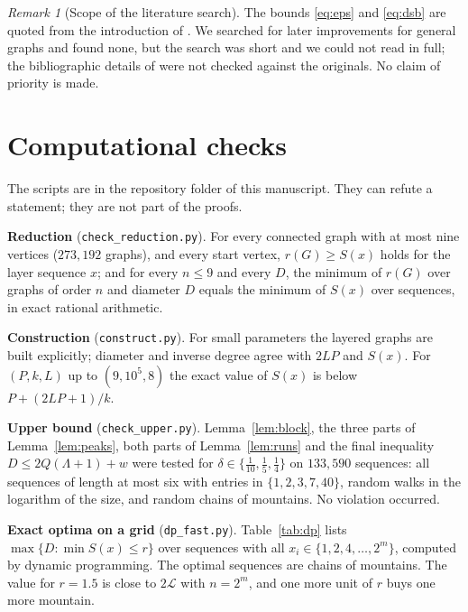 \documentclass[11pt]{amsart}
\theoremstyle{definition}
\theoremstyle{remark}
\newtheorem{remark}[theorem]{Remark}
\newcommand{\Lz}{\mathcal{L}}
\begin{document}
\begin{remark}[Scope of the literature search]
The bounds \eqref{eq:eps} and \eqref{eq:dsb} are quoted from the introduction of \cite{LS}.
We searched for later improvements for general graphs and found none, but the search was short and we could not read \cite{EPS,DSB,M10} in full; the bibliographic details of \cite{DSB,EPS,FMP,LS} were not checked against the originals.
No claim of priority is made.
\end{remark}

\appendix
\section{Computational checks}

The scripts are in the repository folder of this manuscript. They can refute a statement; they are not part of the proofs.

\smallskip\noindent\textbf{Reduction} (\texttt{check\_reduction.py}).
For every connected graph with at most nine vertices ($273{,}192$ graphs), and every start vertex, $r(G)\ge S(x)$ holds for the layer sequence $x$; and for every $n\le9$ and every $D$, the minimum of $r(G)$ over graphs of order $n$ and diameter $D$ equals the minimum of $S(x)$ over sequences, in exact rational arithmetic.

\smallskip\noindent\textbf{Construction} (\texttt{construct.py}).
For small parameters the layered graphs are built explicitly; diameter and inverse degree agree with $2LP$ and $S(x)$. For $(P,k,L)$ up to $(9,10^5,8)$ the exact value of $S(x)$ is below $P+(2LP+1)/k$.

\smallskip\noindent\textbf{Upper bound} (\texttt{check\_upper.py}).
Lemma~\ref{lem:block}, the three parts of Lemma~\ref{lem:peaks}, both parts of Lemma~\ref{lem:runs} and the final inequality $D\le2Q(\Lambda+1)+w$ were tested for $\delta\in\{\frac1{10},\frac15,\frac14\}$ on $133{,}590$ sequences: all sequences of length at most six with entries in $\{1,2,3,7,40\}$, random walks in the logarithm of the size, and random chains of mountains. No violation occurred.

\smallskip\noindent\textbf{Exact optima on a grid} (\texttt{dp\_fast.py}).
Table~\ref{tab:dp} lists $\max\{D: \min S(x)\le r\}$ over sequences with all $x_i\in\{1,2,4,\dots,2^m\}$, computed by dynamic programming. The optimal sequences are chains of mountains. The value for $r=1.5$ is close to $2\Lz$ with $n=2^m$, and one more unit of $r$ buys one more mountain.
\end{document}
